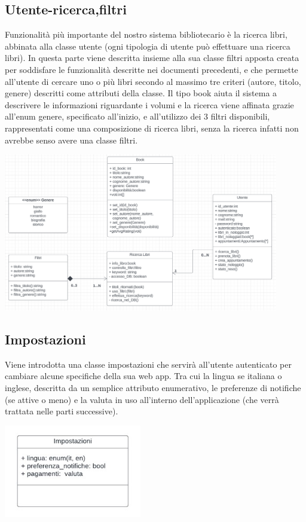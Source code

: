 \documentclass{article}
\begin{document}
\subsection{Utente-ricerca,filtri}
Funzionalità più importante del nostro sistema bibliotecario è la ricerca libri, abbinata alla classe utente (ogni tipologia di utente può effettuare una ricerca libri). In questa parte viene descritta insieme alla sua classe filtri apposta creata per soddisfare le funzionalità descritte nei documenti precedenti, e che permette all’utente di cercare uno o più libri secondo al massimo tre criteri (autore, titolo, genere) descritti come attributi della  classe. Il tipo book aiuta il sistema a descrivere le informazioni riguardante i volumi e la ricerca viene affinata grazie all’enum genere, specificato all’inizio, e all’utilizzo dei 3 filtri disponibili, rappresentati come una composizione di ricerca libri, senza la ricerca infatti non avrebbe senso avere una classe filtri.
\begin{center}
        \includegraphics[width=120mm]{D3/Images/RicercaCompleta.png}
\end{center}

\subsection{Impostazioni} 
Viene introdotta una classe impostazioni che servirà all’utente autenticato per cambiare alcune specifiche della sua web app. Tra cui la lingua se italiana o inglese, descritta da un semplice attributo enumerativo, le preferenze di notifiche (se attive o meno) e la valuta in uso all’interno dell’applicazione (che verrà trattata nelle parti successive).
\begin{center}
        \includegraphics[width=60mm]{D3/Images/Impostazioni.jpg}
\end{center}
\end{document}
